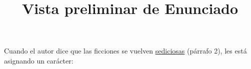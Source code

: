 \documentclass[a4paper,12pt]{article}\usepackage[utf8]{inputenc}\usepackage[spanish]{babel}\usepackage{times}
\title{Vista preliminar de Enunciado}
\begin{document}
\twocolumn 

\maketitle

Cuando el autor dice que las ficciones se vuelven \underline{ sediciosas} (párrafo 2), les está asignando un carácter:
\end{document}

